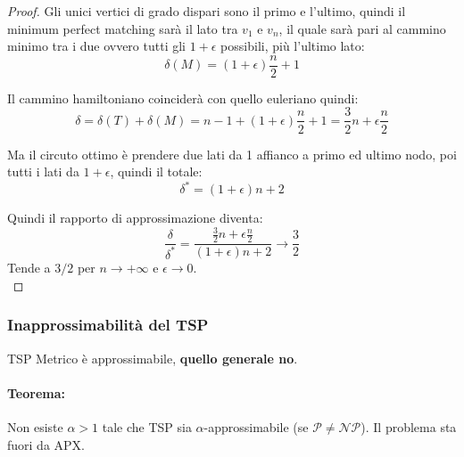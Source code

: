 \begin{proof}
	Gli unici vertici di grado dispari sono il primo e l'ultimo, quindi il minimum perfect matching sarà il lato tra $v_1$ e $v_n$, il quale sarà pari al cammino minimo tra i due ovvero tutti gli $1 + \epsilon$ possibili, più l'ultimo lato:
	$$ \delta(M) = (1 + \epsilon) \frac{n}{2} + 1$$
	
	Il cammino hamiltoniano coinciderà con quello euleriano quindi:
	$$ \delta = \delta (T) + \delta (M) = n-1 + (1 + \epsilon) \frac{n}{2} + 1 = \frac{3}{2} n + \epsilon \frac{n}{2} $$
	
	Ma il circuto ottimo è prendere due lati da 1 affianco a primo ed ultimo nodo, poi tutti i lati da $1 + \epsilon$, quindi il totale: 
	$$ \delta^\ast = (1+ \epsilon)n + 2 $$
	
	Quindi il rapporto di approssimazione diventa: 
	$$ \frac{\delta}{\delta^\ast} = \frac{\frac{3}{2}n + \epsilon \frac{n}{2}}{ (1 + \epsilon) n + 2} \rightarrow \frac{3}{2}$$
	Tende a $3/2$ per $n \rightarrow +\infty$ e $\epsilon \rightarrow 0$.\\
\end{proof}

\newpage


\subsubsection{Inapprossimabilità del TSP}

TSP Metrico è approssimabile, \textbf{quello generale no}.\\

\paragraph{Teorema:} Non esiste $\alpha>1$ tale che TSP sia $\alpha$-approssimabile (se $\mathcal{P} \neq \mathcal{NP}$). Il problema sta fuori da APX.\\

